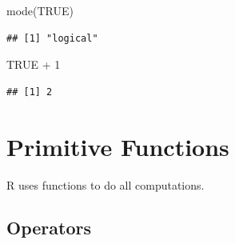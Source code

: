 \documentclass[
]{book}
\newenvironment{Shaded}{\begin{snugshade}}{\end{snugshade}}
\newcommand{\ConstantTok}[1]{\textcolor[rgb]{0.00,0.00,0.00}{#1}}
\newcommand{\DecValTok}[1]{\textcolor[rgb]{0.00,0.00,0.81}{#1}}
\newcommand{\FunctionTok}[1]{\textcolor[rgb]{0.00,0.00,0.00}{#1}}
\newcommand{\NormalTok}[1]{#1}
\newcommand{\SpecialCharTok}[1]{\textcolor[rgb]{0.00,0.00,0.00}{#1}}
\begin{document}
\begin{Shaded}
\begin{Highlighting}[]
\FunctionTok{mode}\NormalTok{(}\ConstantTok{TRUE}\NormalTok{)}
\end{Highlighting}
\end{Shaded}

\begin{verbatim}
## [1] "logical"
\end{verbatim}

\begin{Shaded}
\begin{Highlighting}[]
\ConstantTok{TRUE} \SpecialCharTok{+} \DecValTok{1}
\end{Highlighting}
\end{Shaded}

\begin{verbatim}
## [1] 2
\end{verbatim}

\hypertarget{primitive-functions}{%
\section{Primitive Functions}\label{primitive-functions}}

R uses functions to do all computations.

\hypertarget{operators}{%
\subsection{Operators}\label{operators}}
\end{document}

